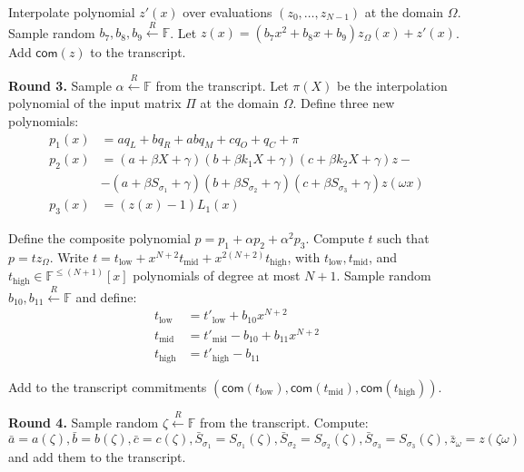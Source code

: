 \documentclass[../lecture-notes.tex]{subfiles}
\begin{document}
Interpolate polynomial $z'(x)$ over evaluations $(z_0, \dots, z_{N-1})$ at the
domain $\Omega$. Sample random $b_7, b_8, b_9 \xleftarrow{R} \mathbb{F}$. Let $z(x)
= (b_7 x^2 + b_8 x + b_9)z_{\Omega}(x) + z'(x)$. Add $\mathsf{com}(z)$ to the transcript.

\textcolor{green!60!black}{\textbf{Round 3.}} Sample $\alpha \xleftarrow{R}
\mathbb{F}$ from the transcript. Let $\pi(X)$ be the interpolation polynomial of the
input matrix $\Pi$ at the domain $\Omega$. Define three new polynomials:
\begin{align*}
p_1(x) &= aq_L + bq_R + abq_M + cq_O + q_C + \pi \\
p_2(x) &= (a + \beta X + \gamma)(b + \beta k_1 X + \gamma)(c + \beta k_2 X + \gamma)z - \\
    &- (a + \beta S_{\sigma_1} + \gamma)(b + \beta S_{\sigma_2} + \gamma)(c + \beta S_{\sigma_3} + \gamma)z(\omega x) \\
p_3(x) &= (z(x) - 1)L_1(x)
\end{align*}

Define the composite polynomial $p = p_1 + \alpha p_2 + \alpha^2 p_3$. Compute
$t$ such that $p = tz_{\Omega}$. Write $t = t_{\text{low}} +
x^{N+2}t_{\text{mid}} + x^{2(N+2)}t_{\text{high}}$, with $t_{\text{low}},
t_{\text{mid}}$, and $t_{\text{high}} \in \mathbb{F}^{\leq (N+1)}[x]$
polynomials of degree at most $N+1$. Sample random $b_{10}, b_{11}
\xleftarrow{R} \mathbb{F}$ and define:
\begin{align*}
t_{\text{low}} &= t'_{\text{low}} + b_{10}x^{N+2} \\
t_{\text{mid}} &= t'_{\text{mid}} - b_{10} + b_{11}x^{N+2} \\
t_{\text{high}} &= t'_{\text{high}} - b_{11}
\end{align*}

Add to the transcript commitments $(\mathsf{com}(t_{\text{low}}), \mathsf{com}(t_{\text{mid}}), \mathsf{com}(t_{\text{high}}))$.

\textcolor{green!60!black}{\textbf{Round 4.}} Sample random $\zeta \xleftarrow{R}
\mathbb{F}$ from the transcript. Compute:
\[\bar{a} = a(\zeta), \bar{b} = b(\zeta), \bar{c} = c(\zeta), \bar{S}_{\sigma_1} = S_{\sigma_1}(\zeta), \bar{S}_{\sigma_2} = S_{\sigma_2}(\zeta), \bar{S}_{\sigma_3} = S_{\sigma_3}(\zeta), \bar{z}_{\omega} = z(\zeta \omega)\]
and add them to the transcript.
\end{document}
